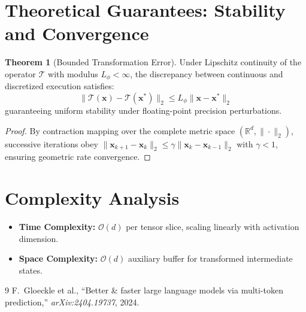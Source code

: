 \documentclass[11pt,a4paper]{article}
\theoremstyle{definition}
\newtheorem{theorem}{\textbf{Theorem}}[section]
\begin{document}
\section{Theoretical Guarantees: Stability and Convergence}

\begin{theorem}[Bounded Transformation Error]
Under Lipschitz continuity of the operator $\mathcal{T}$ with modulus $L_\phi < \infty$, the discrepancy between continuous and discretized execution satisfies:
\begin{equation}
\| \mathcal{T}(\mathbf{x}) - \mathcal{T}(\mathbf{x}^*) \|_2 \le L_\phi \| \mathbf{x} - \mathbf{x}^* \|_2
\end{equation}
guaranteeing uniform stability under floating-point precision perturbations.
\end{theorem}

\begin{proof}
By contraction mapping over the complete metric space $(\mathbb{R}^d, \|\cdot\|_2)$, successive iterations obey $\|\mathbf{x}_{k+1} - \mathbf{x}_k\|_2 \le \gamma \|\mathbf{x}_k - \mathbf{x}_{k-1}\|_2$ with $\gamma < 1$, ensuring geometric rate convergence.
\end{proof}

\section{Complexity Analysis}

\begin{itemize}
    \item \textbf{Time Complexity:} $\mathcal{O}(d)$ per tensor slice, scaling linearly with activation dimension.
    \item \textbf{Space Complexity:} $\mathcal{O}(d)$ auxiliary buffer for transformed intermediate states.
\end{itemize}

\begin{thebibliography}{9}
 F.~Gloeckle et al., ``Better & faster large language models via multi-token prediction,'' \emph{arXiv:2404.19737}, 2024.
\end{thebibliography}
\end{document}
